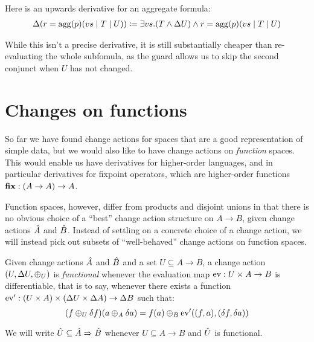 Here is an upwards derivative for an aggregate formula:
\begin{align*}
  \Delta(r = \mathrm{agg}(p)(vs \mid T \mid U)) \coloneqq \exists vs. (T \wedge \Delta{U}) \wedge r = \mathrm{agg}(p)(vs \mid T \mid U)
\end{align*}

While this isn't a precise derivative, it is still substantially cheaper than
re-evaluating the whole subfomula, as the guard allows us to skip the second conjunct when $U$
has not changed.

%

\section{Changes on functions}

So far we have found change actions for spaces that are a good representation of
simple data, but we would also like to have change actions on
\emph{function} spaces. This would enable us have derivatives for higher-order languages, and in particular derivatives for
fixpoint operators, which are higher-order functions $\mathbf{fix} : (A \rightarrow A) \rightarrow A$. 

Function spaces, however, differ from products and disjoint unions in that there is no obvious choice
of a ``best'' change action structure on $A \rightarrow B$, given change actions $\hat{A}$ and $\hat{B}$.
Instead of settling on a concrete choice of a change action, we will instead
pick out subsets of ``well-behaved'' change actions on function spaces.

\begin{defn}
  \label{def:functionalChanges}
  Given change actions $\hat{A}$ and $\hat{B}$ and a set $U \subseteq A \rightarrow B$, a change action
  $(U, \Delta U, \oplus_U)$ is \emph{functional} whenever the evaluation map $\operatorname{ev} : U \times A \rightarrow B$
  is differentiable, that is to say, whenever there exists a function 
  $\operatorname{ev}' : (U \times A) \times (\Delta U \times \Delta A) \rightarrow \Delta B$ such that:
  \begin{displaymath}
    (f \oplus_U \delta f)(a \oplus_A \delta a) = 
    f(a) \oplus_B \operatorname{ev}'((f, a), (\delta f, \delta a))
  \end{displaymath}
  
  We will write $\hat{U} \subseteq \hat{A} \Rightarrow \hat{B}$ whenever 
  $U \subseteq A \rightarrow B$ and $\hat{U}$ is functional.
\end{defn}

